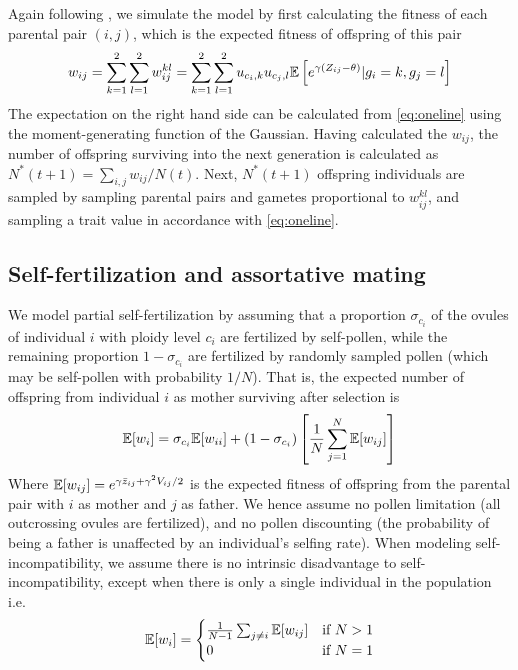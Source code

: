 \documentclass[11pt,a4paper]{article}
\begin{document}
Again following \cite{barton2018}, we simulate the model by first calculating
the fitness of each parental pair $(i,j)$, which is the expected fitness of
offspring of this pair
\begin{equation}
  w_{ij}
    = \sum_{k=1}^2\sum_{l=1}^2 w_{ij}^{kl}
    = \sum_{k=1}^2\sum_{l=1}^2 u_{c_{i},k}u_{c_{j},l}
        \mathbb{E}\left[e^{\gamma(Z_{ij} - \theta)}|g_i=k,g_j=l\right]
\end{equation}
The expectation on the right hand side can be calculated from \cref{eq:oneline}
using the moment-generating function of the Gaussian.
Having calculated the $w_{ij}$, the number of offspring surviving into the next
generation is calculated as $N^\ast(t+1) = \sum_{i,j}w_{ij}/N(t)$.
Next, $N^\ast(t+1)$ offspring individuals are sampled by sampling parental
pairs and gametes proportional to $w_{ij}^{kl}$, and sampling a trait value
in accordance with \cref{eq:oneline}. 


\subsection*{Self-fertilization and assortative mating}

We model partial self-fertilization by assuming that a proportion
$\sigma_{c_i}$ of the ovules of individual $i$ with ploidy level $c_i$ are
fertilized by self-pollen, while the remaining proportion $1-\sigma_{c_i}$ are
fertilized by randomly sampled pollen (which may be self-pollen with
probability $1/N$). 
That is, the expected number of offspring from individual $i$ as mother
surviving after selection is
\begin{equation}
\mathbb{E}[w_i] = \sigma_{c_i} \mathbb{E}[w_{ii}] +
  (1-\sigma_{c_i})\left[\frac{1}{N}\sum_{j=1}^N \mathbb{E}[w_{ij}]\right]
\end{equation}
Where $\mathbb{E}[w_{ij}] = e^{\gamma \bar{z}_{ij} + \gamma^2 V_{ij}/2}$ is the
expected fitness of offspring from the parental pair with $i$ as mother and $j$
as father.
We hence assume no pollen limitation (all outcrossing ovules are fertilized),
and no pollen discounting (the probability of being a father is unaffected by
an individual's selfing rate).
When modeling self-incompatibility, we assume there is no intrinsic
disadvantage to self-incompatibility, except when there is only a single
individual in the population i.e.
\begin{equation}
\mathbb{E}[w_i] = \begin{cases}
    \frac{1}{N-1}\sum_{j \ne i }\mathbb{E}[w_{ij}] & \text{if } N > 1\\ 
    0 & \text{if } N=1 \end{cases}
\end{equation}
\end{document}
